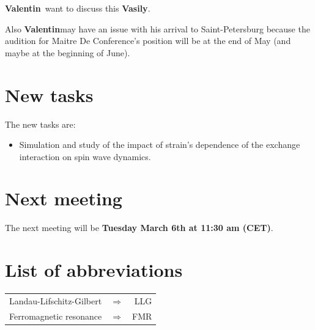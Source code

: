 \documentclass[12pt,a4paper]{article}
\newcommand{\valentin}{\textbf{Valentin}}
\newcommand{\vasily}{\textbf{Vasily}}
\begin{document}
\valentin\ want to discuss this \vasily.

Also \valentin may have an issue with his arrival to Saint-Petersburg because the audition for Maitre De Conference's position will be at the end of May (and maybe at the beginning of June).

\section{New tasks}

The new tasks are:
\begin{itemize}
    \item Simulation and study of the impact of strain's dependence of the exchange interaction on spin wave dynamics.
\end{itemize}

\section*{Next meeting}

The next meeting will be \textbf{Tuesday March 6th at 11:30 am (CET)}.

\newpage

\section*{List of abbreviations}

\begin{table}[ht]
    \begin{tabular}{ l c r }
        Landau-Lifschitz-Gilbert & $\Longrightarrow$ & LLG \\
        Ferromagnetic resonance & $\Longrightarrow$ & FMR \\
    \end{tabular}
\end{table}

%
%
\end{document}
